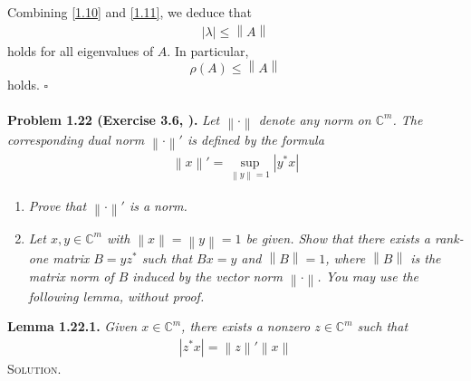 \documentclass[a4paper,oneside]{book}
\numberwithin{equation}{chapter}
\begin{document}
Combining \eqref{1.10} and \eqref{1.11}, we deduce that
\begin{align}
\left| \lambda  \right| \le \left\| A \right\|
\end{align}
holds for all eigenvalues of $A$. In particular, 
\begin{equation}
\rho \left( A \right) \le \left\| A \right\|
\end{equation}
holds. \hfill $\square$\\
\\
\textbf{Problem 1.22 (Exercise 3.6, \cite{1}).} \textit{Let $\left\|  \cdot  \right\|$ denote any norm on $\mathbb{C}^m$. The corresponding dual norm $\left\|  \cdot  \right\|'$ is defined by the formula}
\begin{align}
\left\| x \right\|' = \mathop {\sup }\limits_{\left\| y \right\| = 1} \left| {{y^*}x} \right|
\end{align}
\begin{enumerate}
\item \textit{Prove that $\left\|  \cdot  \right\|'$ is a norm.}
\item \textit{Let $x,y \in \mathbb{C}^m$ with $\left\| x \right\| = \left\| y \right\| = 1$ be given. Show that there exists a rank-one matrix $B=yz^*$ such that $Bx=y$ and $\left\| B \right\| = 1$, where $\left\| B \right\|$ is the matrix norm of $B$ induced by the vector norm $\left\|  \cdot  \right\|$. You may use the following lemma, without proof.}\\
\end{enumerate}
\textbf{Lemma 1.22.1.} \textit{Given $x\in \mathbb{C}^m$, there exists a nonzero $z \in \mathbb{C}^m$ such that}
\begin{align}
\left| {{z^*}x} \right| = \left\| z \right\|'\left\| x \right\|
\end{align}
\textsc{Solution.} 
\end{document}

